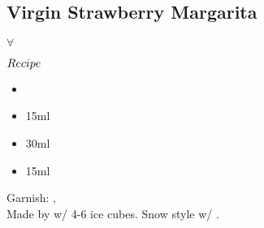 \subsection{Virgin Strawberry Margarita}
\vspace{-8.mm}
\hspace{72mm}
$\forall$
\vspace{2.5mm}
\begin{itembox}[l]{\boldmath $Recipe$}
\begin{itemize}
\setlength{\parskip}{0cm}
\setlength{\itemsep}{0cm}
\item {}
\item \limj 15ml
\item \oj 30ml
\item \gumsyrup 15ml
\end{itemize}
\vspace{-4mm}
Garnish: \strawberry, \lime\\
Made by \blend w/ 4-6 ice cubes. Snow style w/ \sugar
\hspace{-1mm}.
\end{itembox}

